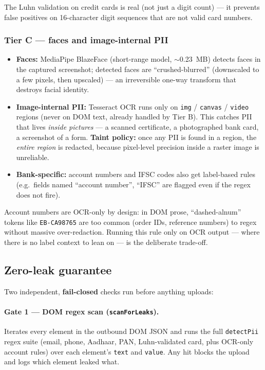 \documentclass[11pt,a4paper]{article}
\newcommand{\code}[1]{\texttt{#1}}
\begin{document}
The Luhn validation on credit cards is real (not just a digit count) --- it prevents false positives on 16-character digit sequences that are not valid card numbers.

\subsubsection*{Tier C --- faces and image-internal PII}
\begin{itemize}
  \item \textbf{Faces:} MediaPipe BlazeFace (short-range model, $\sim$0.23~MB) detects faces in the captured screenshot; detected faces are ``crushed-blurred'' (downscaled to a few pixels, then upscaled) --- an irreversible one-way transform that destroys facial identity.
  \item \textbf{Image-internal PII:} Tesseract OCR runs only on \code{img} / \code{canvas} / \code{video} regions (never on DOM text, already handled by Tier B). This catches PII that lives \emph{inside pictures} --- a scanned certificate, a photographed bank card, a screenshot of a form. \textbf{Taint policy:} once any PII is found in a region, the \emph{entire region} is redacted, because pixel-level precision inside a raster image is unreliable.
  \item \textbf{Bank-specific:} account numbers and IFSC codes also get label-based rules (e.g.\ fields named ``account number'', ``IFSC'' are flagged even if the regex does not fire).
\end{itemize}

Account numbers are OCR-only by design: in DOM prose, ``dashed-alnum'' tokens like \code{EB-CA98765} are too common (order IDs, reference numbers) to regex without massive over-redaction. Running this rule only on OCR output --- where there is no label context to lean on --- is the deliberate trade-off.

\subsection{Zero-leak guarantee}
Two independent, \textbf{fail-closed} checks run before anything uploads:

\paragraph{Gate 1 --- DOM regex scan (\code{scanForLeaks}).}
Iterates every element in the outbound DOM JSON and runs the full \code{detectPii} regex suite (email, phone, Aadhaar, PAN, Luhn-validated card, plus OCR-only account rules) over each element's \code{text} and \code{value}. Any hit blocks the upload and logs which element leaked what.
\end{document}

